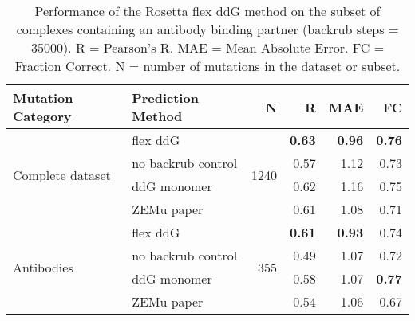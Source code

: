 \begin{table}
  \begin{tabular}{llrrrr}
\toprule
Mutation Category &   Prediction Method &     N &    R &  MAE &   FC \\
\midrule
 \multirow{ 4}{*}{Complete dataset} & flex ddG & \multirow{ 4}{*}{1240} & \textbf{0.63} & \textbf{0.96} & \textbf{0.76}  \\
 & no backrub control & & 0.57 & 1.12 & 0.73  \\
 & ddG monomer & & 0.62 & 1.16 & 0.75  \\
 & ZEMu paper & & 0.61 & 1.08 & 0.71  \\
\hline
 \multirow{ 4}{*}{Antibodies} & flex ddG & \multirow{ 4}{*}{355} & \textbf{0.61} & \textbf{0.93} & 0.74  \\
 & no backrub control & & 0.49 & 1.07 & 0.72  \\
 & ddG monomer & & 0.58 & 1.07 & \textbf{0.77}  \\
 & ZEMu paper & & 0.54 & 1.06 & 0.67  \\
\bottomrule
\end{tabular}
  \caption[Flex ddG performance on antibodies]{
    Performance of the Rosetta flex ddG method on the subset of complexes containing an antibody binding partner (backrub steps = 35000). R = Pearson's R. MAE = Mean Absolute Error. FC = Fraction Correct. N = number of mutations in the dataset or subset.
  } \label{tab:table-antibodies}
\end{table}
